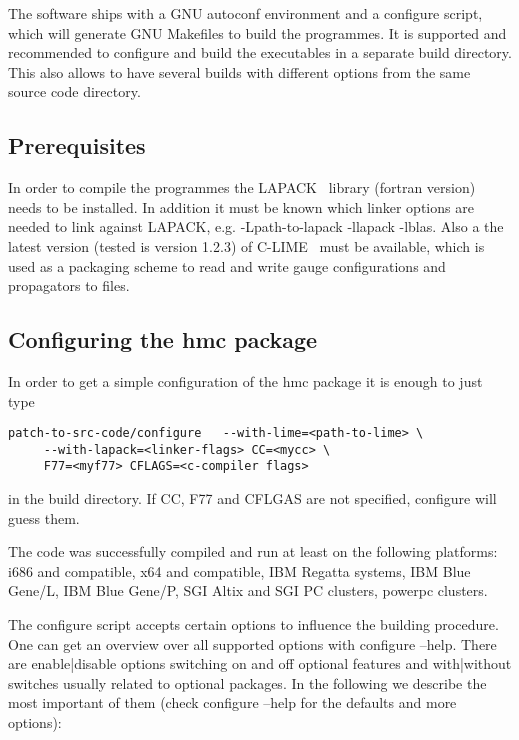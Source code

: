 The software ships with a GNU autoconf environment and a configure
script, which will generate GNU Makefiles to build the programmes. It
is supported and recommended to configure and build the executables in
a separate build directory. This also allows to have several builds with
different options from the same source code directory. 

\subsection{Prerequisites}

In order to compile the programmes the {\ttfamily
  LAPACK}~\cite{lapack:web} library (fortran version) needs to be
installed. In addition it must be known which linker options are
needed to link against {\ttfamily LAPACK}, e.g. {\ttfamily
  -Lpath-to-lapack -llapack  -lblas}. Also a the latest
version (tested is version 1.2.3) of {\ttfamily
  C-LIME}~\cite{lime:web} must be available, which is used as a
packaging scheme to read and write gauge configurations and
propagators to files.

\subsection{Configuring the hmc package}
\label{sec:config}

In order to get a simple configuration of the hmc package it is enough
to just type 
\begin{verbatim}
patch-to-src-code/configure   --with-lime=<path-to-lime> \
     --with-lapack=<linker-flags> CC=<mycc> \
     F77=<myf77> CFLAGS=<c-compiler flags>
\end{verbatim}
in the build directory. If 
{\ttfamily CC, F77} and {\ttfamily CFLGAS} are not specified,
{\ttfamily configure} will guess them.

The code was successfully compiled and run at least on the following
platforms: i686 and compatible, x64 and compatible, IBM Regatta
systems, IBM Blue Gene/L, IBM Blue Gene/P, SGI Altix and SGI PC
clusters, powerpc clusters.

The configure script accepts certain options to influence the building
procedure. One can get an overview over all supported options with
{\ttfamily configure --help}. There are {\ttfamily enable|disable}
options switching on and off optional features and {\ttfamily
  with|without} switches usually related to optional packages. In the
following we describe the most important of them (check {\ttfamily
  configure --help} for the defaults and more options):

